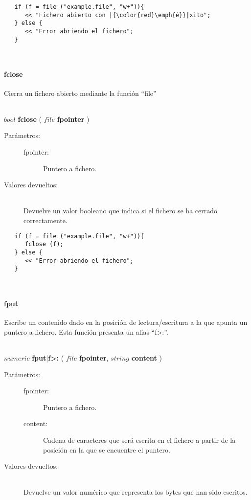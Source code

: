 \begin{lstlisting}  
   if (f = file ("example.file", "w+")){
      << "Fichero abierto con |{\color{red}\emph{é}}|xito";
   } else {
      << "Error abriendo el fichero";
   }
\end{lstlisting}
\hfill\\ 

\paragraph{fclose}
Cierra un fichero abierto mediante la función ``file''

\hfill \\ $bool$ \textbf{fclose} ( $file$ \textbf{fpointer}  )  
\begin{description}
\item [Parámetros:] \hfill 
   \begin{description}
   \item[fpointer:] Puntero a fichero. 
   \end{description}
\item[Valores devueltos:] \hfill \\
   Devuelve un valor booleano que indica si el fichero se ha cerrado correctamente.
\end{description}

\begin{lstlisting}  
   if (f = file ("example.file", "w+")){
      fclose (f); 
   } else {
      << "Error abriendo el fichero";
   }
\end{lstlisting}
\hfill\\ 

\paragraph{fput}
Escribe un contenido dado en la posición de lectura/escritura a la que apunta un puntero a fichero. Esta función presenta un alias ``f>:''.

\hfill \\ $numeric$ \textbf{fput}|\textbf{f>:} ( $file$ \textbf{fpointer}, $string$ \textbf{content}  )  
\begin{description}
\item [Parámetros:] \hfill 
   \begin{description}
   \item[fpointer:] Puntero a fichero. 
   \item[content:] Cadena de caracteres que será escrita en el fichero a partir de la posición en la que se encuentre el puntero. 
   \end{description}
\item[Valores devueltos:] \hfill \\
   Devuelve un valor numérico que representa los bytes que han sido escritos.
\end{description}

